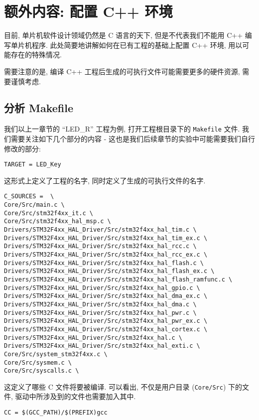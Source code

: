 \chapter{额外内容: 配置 C++ 环境}
目前, 单片机软件设计领域仍然是 C 语言的天下, 但是不代表我们不能用 C++ 编写单片机程序. 此处简要地讲解如何在已有工程的基础上配置 C++ 环境, 用以可能存在的特殊情况.

需要注意的是, 编译 C++ 工程后生成的可执行文件可能需要更多的硬件资源, 需要谨慎考虑.

\section{分析 Makefile}
我们以上一章节的 ``LED\_R'' 工程为例, 打开工程根目录下的 \texttt{Makefile} 文件. 我们需要关注如下几个部分的内容 - 这也是我们后续章节的实验中可能需要我们自行修改的部分:

\begin{verbatim}
TARGET = LED_Key
\end{verbatim}

这形式上定义了工程的名字, 同时定义了生成的可执行文件的名字.

\begin{verbatim}
C_SOURCES =  \
Core/Src/main.c \
Core/Src/stm32f4xx_it.c \
Core/Src/stm32f4xx_hal_msp.c \
Drivers/STM32F4xx_HAL_Driver/Src/stm32f4xx_hal_tim.c \
Drivers/STM32F4xx_HAL_Driver/Src/stm32f4xx_hal_tim_ex.c \
Drivers/STM32F4xx_HAL_Driver/Src/stm32f4xx_hal_rcc.c \
Drivers/STM32F4xx_HAL_Driver/Src/stm32f4xx_hal_rcc_ex.c \
Drivers/STM32F4xx_HAL_Driver/Src/stm32f4xx_hal_flash.c \
Drivers/STM32F4xx_HAL_Driver/Src/stm32f4xx_hal_flash_ex.c \
Drivers/STM32F4xx_HAL_Driver/Src/stm32f4xx_hal_flash_ramfunc.c \
Drivers/STM32F4xx_HAL_Driver/Src/stm32f4xx_hal_gpio.c \
Drivers/STM32F4xx_HAL_Driver/Src/stm32f4xx_hal_dma_ex.c \
Drivers/STM32F4xx_HAL_Driver/Src/stm32f4xx_hal_dma.c \
Drivers/STM32F4xx_HAL_Driver/Src/stm32f4xx_hal_pwr.c \
Drivers/STM32F4xx_HAL_Driver/Src/stm32f4xx_hal_pwr_ex.c \
Drivers/STM32F4xx_HAL_Driver/Src/stm32f4xx_hal_cortex.c \
Drivers/STM32F4xx_HAL_Driver/Src/stm32f4xx_hal.c \
Drivers/STM32F4xx_HAL_Driver/Src/stm32f4xx_hal_exti.c \
Core/Src/system_stm32f4xx.c \
Core/Src/sysmem.c \
Core/Src/syscalls.c \
\end{verbatim}

这定义了哪些 C 文件将要被编译. 可以看出, 不仅是用户目录 (\texttt{Core/Src}) 下的文件, 驱动中所涉及到的文件也需要加入其中.

\begin{verbatim}
CC = $(GCC_PATH)/$(PREFIX)gcc
\end{verbatim}

